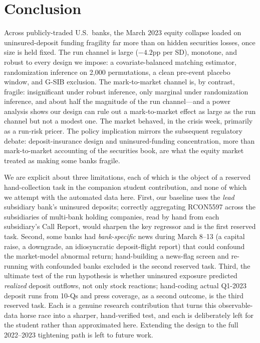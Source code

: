 \documentclass[12pt]{article}
\begin{document}
\section{Conclusion}\label{sec:concl}
Across publicly-traded U.S.\ banks, the March 2023 equity collapse loaded on
uninsured-deposit funding fragility far more than on hidden securities losses, once size is
held fixed. The run channel is large ($-4.2$pp per SD), monotone, and robust to every design
we impose: a covariate-balanced matching estimator, randomization inference on 2{,}000
permutations, a clean pre-event placebo window, and G-SIB exclusion. The mark-to-market
channel is, by contrast, fragile: insignificant under robust inference, only marginal under
randomization inference, and about half the magnitude of the run channel---and a power
analysis shows our design can rule out a mark-to-market effect as large as the run channel
but not a modest one. The market behaved, in the crisis week, primarily as a run-risk pricer.
The policy implication mirrors the subsequent regulatory debate: deposit-insurance design and
uninsured-funding concentration, more than mark-to-market accounting of the securities book,
are what the equity market treated as making some banks fragile.

We are explicit about three limitations, each of which is the object of a reserved
hand-collection task in the companion student contribution, and none of which we attempt with
the automated data here. First, our baseline uses the \emph{lead} subsidiary bank's uninsured
deposits; correctly aggregating RCON5597 across the subsidiaries of multi-bank holding
companies, read by hand from each subsidiary's Call Report, would sharpen the key regressor
and is the first reserved task. Second, some banks had \emph{bank-specific} news during
March 8--13 (a capital raise, a downgrade, an idiosyncratic deposit-flight report) that could
confound the market-model abnormal return; hand-building a news-flag screen and re-running with
confounded banks excluded is the second reserved task. Third, the ultimate test of the run
hypothesis is whether uninsured exposure predicted \emph{realized} deposit outflows, not only
stock reactions; hand-coding actual Q1-2023 deposit runs from 10-Qs and press coverage, as a
second outcome, is the third reserved task. Each is a genuine research contribution that turns
this observable-data horse race into a sharper, hand-verified test, and each is deliberately
left for the student rather than approximated here. Extending the design to the full
2022--2023 tightening path is left to future work.
\end{document}
